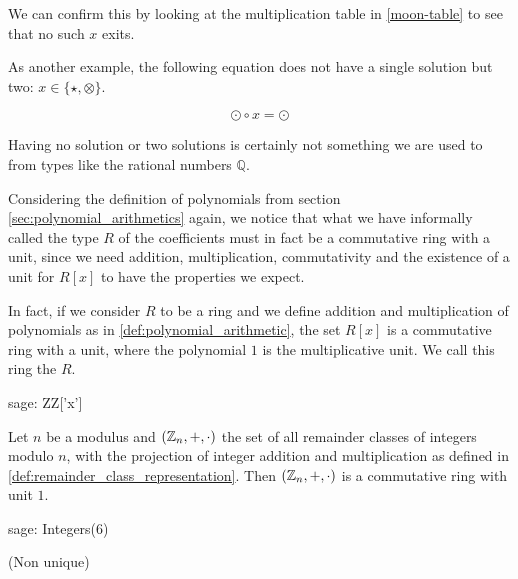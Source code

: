 \begin{example}
We can confirm this by looking at the multiplication table in \eqref{moon-table} to see that no such $x$ exits.

As another example, the following equation does not have a single solution but two: $x\in\{\star, \otimes\}$.

\begin{equation}
\odot \circ x = \odot
\end{equation}

Having no solution or two solutions is certainly not something we are used to from types like the rational numbers $\mathbb{Q}$.
\end{example}

\begin{example} Considering the definition of polynomials from section \ref{sec:polynomial_arithmetics} again, we notice that what we have informally called the type $R$ of the coefficients must in fact be a commutative ring with a unit, since we need addition, multiplication, commutativity and the existence of a unit for $R[x]$ to have the properties we expect.

In fact, if we consider $R$ to be a ring and we define addition and multiplication of polynomials as in \eqref{def:polynomial_arithmetic}, the set $R[x]$ is a commutative ring with a unit, where the polynomial $1$ is the multiplicative unit. We call this ring the  $R$.
\begin{sagecommandline}
sage: ZZ['x']
\end{sagecommandline}
\end{example}
\begin{example}
\label{def:ring_of_mod_n_arithmetics}
 Let $n$ be a modulus and $(\mathbb{Z}_n,+,\cdot)$ the set of all remainder classes of integers modulo $n$, with the projection of integer addition and multiplication as defined in \secname \ref{def:remainder_class_representation}. Then $(\mathbb{Z}_n,+,\cdot)$ is a commutative ring with unit $1$.
\begin{sagecommandline}
sage: Integers(6)
\end{sagecommandline}
\end{example}
\begin{example}
 (Non unique)
\end{example}

